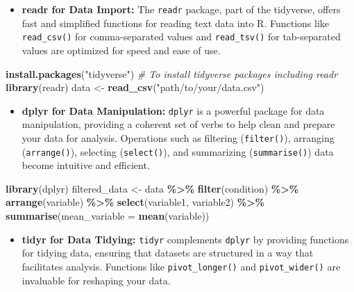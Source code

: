 \documentclass[
]{book}
\newenvironment{Shaded}{\begin{snugshade}}{\end{snugshade}}
\newcommand{\AttributeTok}[1]{\textcolor[rgb]{0.13,0.29,0.53}{#1}}
\newcommand{\CommentTok}[1]{\textcolor[rgb]{0.56,0.35,0.01}{\textit{#1}}}
\newcommand{\FunctionTok}[1]{\textcolor[rgb]{0.13,0.29,0.53}{\textbf{#1}}}
\newcommand{\NormalTok}[1]{#1}
\newcommand{\OtherTok}[1]{\textcolor[rgb]{0.56,0.35,0.01}{#1}}
\newcommand{\SpecialCharTok}[1]{\textcolor[rgb]{0.81,0.36,0.00}{\textbf{#1}}}
\newcommand{\StringTok}[1]{\textcolor[rgb]{0.31,0.60,0.02}{#1}}
\providecommand{\tightlist}{%
  \setlength{\itemsep}{0pt}\setlength{\parskip}{0pt}}
\begin{document}
\begin{itemize}
\tightlist
\item
  \textbf{readr for Data Import:} The \texttt{readr} package, part of the tidyverse, offers fast and simplified functions for reading text data into R. Functions like \texttt{read\_csv()} for comma-separated values and \texttt{read\_tsv()} for tab-separated values are optimized for speed and ease of use.
\end{itemize}

\begin{Shaded}
\begin{Highlighting}[]
\FunctionTok{install.packages}\NormalTok{(}\StringTok{"tidyverse"}\NormalTok{) }\CommentTok{\# To install tidyverse packages including readr}
\FunctionTok{library}\NormalTok{(readr)}
\NormalTok{data }\OtherTok{\textless{}{-}} \FunctionTok{read\_csv}\NormalTok{(}\StringTok{"path/to/your/data.csv"}\NormalTok{)}
\end{Highlighting}
\end{Shaded}

\begin{itemize}
\tightlist
\item
  \textbf{dplyr for Data Manipulation:} \texttt{dplyr} is a powerful package for data manipulation, providing a coherent set of verbs to help clean and prepare your data for analysis. Operations such as filtering (\texttt{filter()}), arranging (\texttt{arrange()}), selecting (\texttt{select()}), and summarizing (\texttt{summarise()}) data become intuitive and efficient.
\end{itemize}

\begin{Shaded}
\begin{Highlighting}[]
\FunctionTok{library}\NormalTok{(dplyr)}
\NormalTok{filtered\_data }\OtherTok{\textless{}{-}}\NormalTok{ data }\SpecialCharTok{\%\textgreater{}\%}
  \FunctionTok{filter}\NormalTok{(condition) }\SpecialCharTok{\%\textgreater{}\%}
  \FunctionTok{arrange}\NormalTok{(variable) }\SpecialCharTok{\%\textgreater{}\%}
  \FunctionTok{select}\NormalTok{(variable1, variable2) }\SpecialCharTok{\%\textgreater{}\%}
  \FunctionTok{summarise}\NormalTok{(}\AttributeTok{mean\_variable =} \FunctionTok{mean}\NormalTok{(variable))}
\end{Highlighting}
\end{Shaded}

\begin{itemize}
\tightlist
\item
  \textbf{tidyr for Data Tidying:} \texttt{tidyr} complements \texttt{dplyr} by providing functions for tidying data, ensuring that datasets are structured in a way that facilitates analysis. Functions like \texttt{pivot\_longer()} and \texttt{pivot\_wider()} are invaluable for reshaping your data.
\end{itemize}
\end{document}

